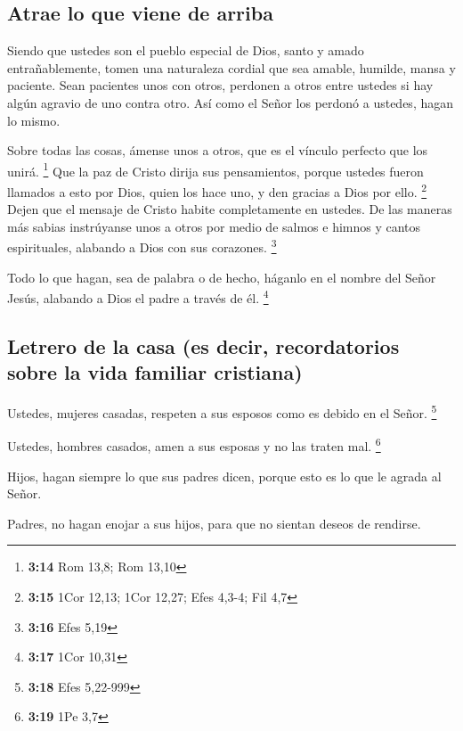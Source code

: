 \hypertarget{atrae-lo-que-viene-de-arriba}{%
\subsection{Atrae lo que viene de
arriba}\label{atrae-lo-que-viene-de-arriba}}

 Siendo que ustedes son el pueblo especial de Dios, santo
y amado entrañablemente, tomen una naturaleza cordial que sea amable,
humilde, mansa y paciente.  Sean pacientes unos con
otros, perdonen a otros entre ustedes si hay algún agravio de uno contra
otro. Así como el Señor los perdonó a ustedes, hagan lo mismo.

 Sobre todas las cosas, ámense unos a otros, que es el
vínculo perfecto que los unirá. \footnote{\textbf{3:14} Rom 13,8; Rom
  13,10}  Que la paz de Cristo dirija sus pensamientos,
porque ustedes fueron llamados a esto por Dios, quien los hace uno, y
den gracias a Dios por ello. \footnote{\textbf{3:15} 1Cor 12,13; 1Cor
  12,27; Efes 4,3-4; Fil 4,7}  Dejen que el mensaje de
Cristo habite completamente en ustedes. De las maneras más sabias
instrúyanse unos a otros por medio de salmos e himnos y cantos
espirituales, alabando a Dios con sus corazones. \footnote{\textbf{3:16}
  Efes 5,19}

 Todo lo que hagan, sea de palabra o de hecho, háganlo en
el nombre del Señor Jesús, alabando a Dios el padre a través de él.
\footnote{\textbf{3:17} 1Cor 10,31}

\hypertarget{letrero-de-la-casa-es-decir-recordatorios-sobre-la-vida-familiar-cristiana}{%
\subsection{Letrero de la casa (es decir, recordatorios sobre la vida
familiar
cristiana)}\label{letrero-de-la-casa-es-decir-recordatorios-sobre-la-vida-familiar-cristiana}}

 Ustedes, mujeres casadas, respeten a sus esposos como es
debido en el Señor. \footnote{\textbf{3:18} Efes 5,22-999}

 Ustedes, hombres casados, amen a sus esposas y no las
traten mal. \footnote{\textbf{3:19} 1Pe 3,7}

 Hijos, hagan siempre lo que sus padres dicen, porque
esto es lo que le agrada al Señor.

 Padres, no hagan enojar a sus hijos, para que no sientan
deseos de rendirse.

